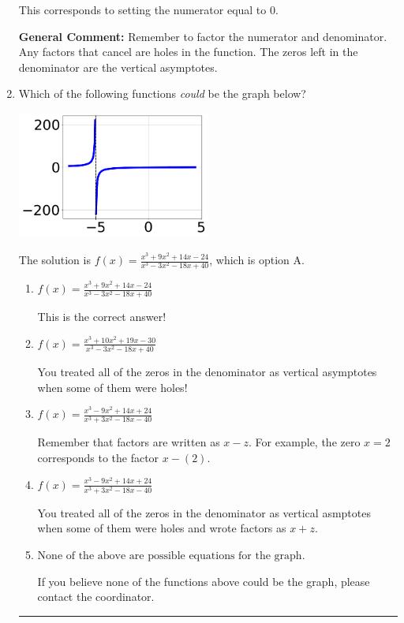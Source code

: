\documentclass{extbook}[14pt]
\newcommand{\litem}[1]{\item #1

\rule{\textwidth}{0.4pt}}
\begin{document}
\begin{enumerate}
{\begin{enumerate}[label=\Alph*.]
This corresponds to setting the numerator equal to 0.
\end{enumerate}

\textbf{General Comment:} Remember to factor the numerator and denominator. Any factors that cancel are holes in the function. The zeros left in the denominator are the vertical asymptotes.
}
\litem{
Which of the following functions \textit{could} be the graph below?

\begin{center}
    \includegraphics[width=0.5\textwidth]{../Figures/identifyGraphOfRationalFunctionCopyC.png}
\end{center}


The solution is \( f(x)=\frac{x^{3} +9 x^{2} +14 x -24}{x^{3} -3 x^{2} -18 x + 40} \), which is option A.\begin{enumerate}[label=\Alph*.]
\item \( f(x)=\frac{x^{3} +9 x^{2} +14 x -24}{x^{3} -3 x^{2} -18 x + 40} \)

This is the correct answer!
\item \( f(x)=\frac{x^{3} +10 x^{2} +19 x -30}{x^{3} -3 x^{2} -18 x + 40} \)

You treated all of the zeros in the denominator as vertical asymptotes when some of them were holes!
\item \( f(x)=\frac{x^{3} -9 x^{2} +14 x + 24}{x^{3} +3 x^{2} -18 x -40} \)

Remember that factors are written as $x-z$. For example, the zero $x=2$ corresponds to the factor $x-(2)$.
\item \( f(x)=\frac{x^{3} -9 x^{2} +14 x + 24}{x^{3} +3 x^{2} -18 x -40} \)

You treated all of the zeros in the denominator as vertical asmptotes when some of them were holes and wrote factors as $x+z$.
\item \( \text{None of the above are possible equations for the graph.} \)

If you believe none of the functions above could be the graph, please contact the coordinator.
\end{enumerate}

}
\end{enumerate}
\end{document}

